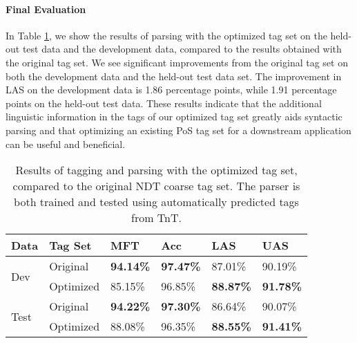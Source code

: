 \documentclass[11pt,a4paper]{article}
\begin{document}
\paragraph{Final Evaluation}
In Table \ref{finalresults}, we show the results of parsing with the optimized
tag set on the held-out test data and the development data, compared to the
results obtained with the original tag set. We see significant improvements
from the original tag set on both the development data and the held-out test
data set. The improvement in LAS on the development data is 1.86 percentage
points, while 1.91 percentage points on the held-out test data. These results
indicate that the additional linguistic information in the tags of our
optimized tag set greatly aids syntactic parsing and that optimizing an
existing PoS tag set for a downstream application can be useful and beneficial.

\begin{table}
    \centering
    \smaller[0.5]
    \begin{tabular}{@{}llllll@{}}
        \toprule
        \textbf{Data} & \textbf{Tag Set} & \textbf{MFT} & \textbf{Acc} &
        \textbf{LAS} & \textbf{UAS} \\
        \midrule
        \multirow{2}{*}{Dev}
        & Original & \textbf{94.14\%} & \textbf{97.47\%} & 87.01\% & 90.19\% \\
        & Optimized & 85.15\% & 96.85\% & \textbf{88.87\%} & \textbf{91.78\%} \\
        \midrule
        \multirow{2}{*}{Test}
        & Original & \textbf{94.22\%} & \textbf{97.30\%} & 86.64\% & 90.07\% \\
        & Optimized & 88.08\% & 96.35\% & \textbf{88.55\%} & \textbf{91.41\%} \\
        \bottomrule
    \end{tabular}
    \caption{Results of tagging and parsing with the optimized tag set,
        compared to the original NDT coarse tag set. The parser is both trained and tested using
        automatically predicted tags from TnT.}
    \label{finalresults}
\end{table}

\end{document}
